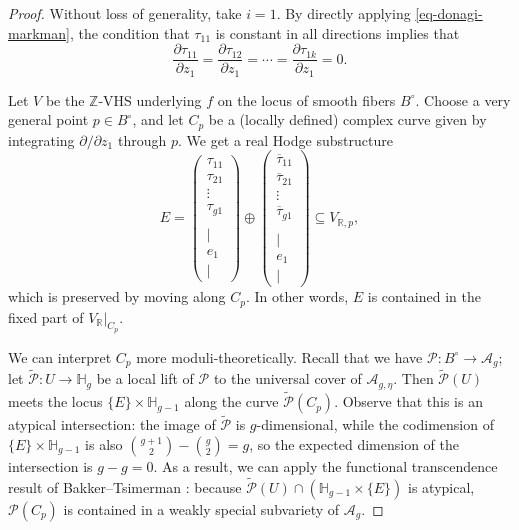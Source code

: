 \documentclass[12pt]{amsart}
\newcommand{\R}{\mathbb{R}}
\newcommand{\Z}{\mathbb{Z}}
\newcommand{\bbH}{\mathbb{H}}
\newcommand{\cP}{\mathcal{P}}
\newcommand{\cA}{\mathcal{A}}
\newcommand{\wt}{\widetilde}
\theoremstyle{definition}
\numberwithin{equation}{section}
\begin{document}
\begin{proof}
Without loss of generality, take \(i = 1\). By directly applying 
\eqref{eq-donagi-markman}, the condition that \(\tau_{11}\) is constant in all 
directions implies that
\begin{equation*}
    \frac{\partial \tau_{11}}{\partial z_1} = \frac{\partial \tau_{12}}{\partial z_1} = 
    \cdots = \frac{\partial \tau_{1k}}{\partial z_1} = 0.
\end{equation*}

Let \(V\) be the \(\Z\)-VHS underlying \(f\) on the locus of smooth fibers \(B^\circ\).
Choose a very general point \(p \in B^\circ\), and let \(C_p\) be a 
(locally defined) complex curve given by integrating \(\partial/\partial z_1\) 
through \(p\). We get a real Hodge substructure
\begin{equation}
    E = \begin{pmatrix}
        \tau_{11} \\ \tau_{21}\\ \vdots \\ \tau_{g1} \\ \\ | \\ e_1 \\ |
    \end{pmatrix} \oplus
    \begin{pmatrix}
        \overline{\tau}_{11} \\ \overline{\tau}_{21} \\ \vdots \\ \overline{\tau}_{g1} \\
        \\ | \\ e_1 \\ |
    \end{pmatrix} \subseteq V_{\R,p},
\end{equation}
which is preserved by moving along \(C_p\). In other words, \(E\) is contained in 
the fixed part of \(V_\R|_{C_p}\).

We can interpret \(C_p\) more moduli-theoretically. Recall that we have 
\(\cP: B^\circ \to \cA_g\); let \(\wt{\cP}: U \to \bbH_g\) be a local lift of \(\cP\) to 
the universal cover of \(\cA_{g, \eta}\). Then \(\wt{\cP}(U)\) meets the locus 
\(\{E\} \times \bbH_{g-1}\) along the curve \(\wt{\cP}(C_p)\). Observe that this is 
an atypical intersection: the image of \(\wt{\cP}\) is \(g\)-dimensional,
while the codimension of \(\{E\} \times \bbH_{g-1}\) is also
\(\binom{g+1}{2} - \binom{g}{2} = g\), so the expected dimension of the intersection 
is \(g - g = 0\). As a result,
we can apply the functional transcendence result of Bakker--Tsimerman 
\cite[Theorem 1.3]{bakker-tsimerman25}: because \(\wt{\cP}(U) \cap (\bbH_{g-1} \times \{E\})\) 
is atypical, \(\cP(C_p)\) is contained in a weakly special subvariety of \(\cA_g\).



\end{proof}
\end{document}
